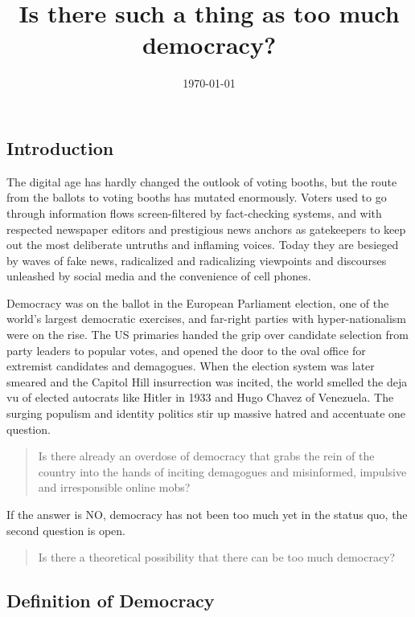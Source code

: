 \documentclass{scrartcl}
\begin{document}
\title{Is there such a thing as too much democracy?}
\author{\today}
\date{}
\maketitle

\subsection*{Introduction}

The digital age has hardly changed the outlook of voting booths, but
the route from the ballots to voting booths has mutated enormously.
Voters used to go through information flows screen-filtered by fact-checking
systems, and with respected newspaper editors and prestigious news
anchors as gatekeepers to keep out the most deliberate untruths and
inflaming voices. Today they are besieged by waves of fake news, radicalized
and radicalizing viewpoints and discourses unleashed by social media
and the convenience of cell phones.

Democracy was on the ballot in the European Parliament election, one of the
world’s largest democratic exercises, and far-right parties with
hyper-nationalism were on the rise. The US primaries handed the grip over
candidate selection from party leaders to popular votes, and opened the door to
the oval office for extremist candidates and demagogues. When the election
system was later smeared and the Capitol Hill insurrection was incited, the
world smelled the deja vu of elected autocrats like Hitler in 1933 and Hugo
Chavez of Venezuela. The surging populism and identity politics stir up massive
hatred and accentuate one question.


\begin{quote}
Is there already an overdose of democracy that grabs the rein of the
country into the hands of inciting demagogues and misinformed, impulsive
and irresponsible online mobs? 
\end{quote}
If the answer is NO, democracy has not been too much yet in the status
quo, the second question is open.
\begin{quote}
Is there a theoretical possibility that there can be too much democracy? 
\end{quote}

\subsection*{Definition of Democracy}
\end{document}
